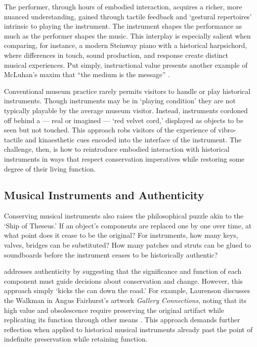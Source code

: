The performer, through hours of embodied interaction, acquires a richer, more nuanced understanding, gained through tactile feedback and `gestural repertoires' \cite[][]{levinson_music_1990} intrinsic to playing the instrument. The instrument shapes the performance as much as the performer shapes the music. This interplay is especially salient when comparing, for instance, a modern Steinway piano with a historical harpsichord, where differences in touch, sound production, and response create distinct musical experiences. Put simply, instructional value presents another example of McLuhan’s maxim that ``the medium is the message'' \cite[][]{mcluhan_understanding_1964}.

Conventional museum practice rarely permits visitors to handle or play historical instruments. Though instruments may be in `playing condition' they are not typically playable by the average museum visitor. Instead, instruments cordoned off behind a --- real or imagined --- `red velvet cord,' \cite{mcalpine_sampling_2014} displayed as objects to be seen but not touched. This approach robs visitors of the experience of vibro-tactile and kinaesthetic cues encoded into the interface of the instrument. The challenge, then, is how to reintroduce embodied interaction with historical instruments in ways that respect conservation imperatives while restoring some degree of their living function.

\subsection{Musical Instruments and Authenticity}

Conserving musical instruments also raises the philosophical puzzle akin to the `Ship of Theseus.' If an object’s components are replaced one by one over time, at what point does it cease to be the original? For instruments, how many keys, valves, bridges can be substituted? How many patches and struts can be glued to soundboards before the instrument ceases to be historically authentic?

\textcite{laurenson_authenticity_2006} addresses authenticity by suggesting that the significance and function of each component must guide decisions about conservation and change. However, this approach simply  `kicks the can down the road.’ For example, Laurenson discusses the Walkman in Angus Fairhurst’s artwork \textit{Gallery Connections}, noting that its high value and obsolescence require preserving the original artifact while replicating its function through other means \cite{laurenson_management_2005}. This approach demands further reflection when applied to historical musical instruments already past the point of indefinite preservation while retaining function.

